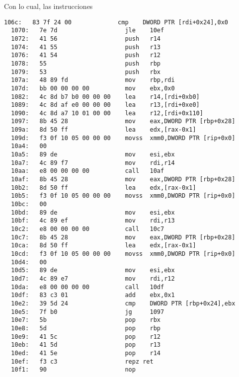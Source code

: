 Con lo cual, las instrucciones


\begin{lstlisting}[title=Función setCavityFlowSpeeds con optimización -O1]
  106c:   83 7f 24 00             cmp    DWORD PTR [rdi+0x24],0x0
  1070:   7e 7d                   jle    10ef
  1072:   41 56                   push   r14
  1074:   41 55                   push   r13
  1076:   41 54                   push   r12
  1078:   55                      push   rbp
  1079:   53                      push   rbx
  107a:   48 89 fd                mov    rbp,rdi
  107d:   bb 00 00 00 00          mov    ebx,0x0
  1082:   4c 8d b7 b0 00 00 00    lea    r14,[rdi+0xb0]
  1089:   4c 8d af e0 00 00 00    lea    r13,[rdi+0xe0]
  1090:   4c 8d a7 10 01 00 00    lea    r12,[rdi+0x110]
  1097:   8b 45 28                mov    eax,DWORD PTR [rbp+0x28]
  109a:   8d 50 ff                lea    edx,[rax-0x1]
  109d:   f3 0f 10 05 00 00 00    movss  xmm0,DWORD PTR [rip+0x0]
  10a4:   00 
  10a5:   89 de                   mov    esi,ebx
  10a7:   4c 89 f7                mov    rdi,r14
  10aa:   e8 00 00 00 00          call   10af
  10af:   8b 45 28                mov    eax,DWORD PTR [rbp+0x28]
  10b2:   8d 50 ff                lea    edx,[rax-0x1]
  10b5:   f3 0f 10 05 00 00 00    movss  xmm0,DWORD PTR [rip+0x0] 
  10bc:   00 
  10bd:   89 de                   mov    esi,ebx
  10bf:   4c 89 ef                mov    rdi,r13
  10c2:   e8 00 00 00 00          call   10c7
  10c7:   8b 45 28                mov    eax,DWORD PTR [rbp+0x28]
  10ca:   8d 50 ff                lea    edx,[rax-0x1]
  10cd:   f3 0f 10 05 00 00 00    movss  xmm0,DWORD PTR [rip+0x0]
  10d4:   00 
  10d5:   89 de                   mov    esi,ebx
  10d7:   4c 89 e7                mov    rdi,r12
  10da:   e8 00 00 00 00          call   10df
  10df:   83 c3 01                add    ebx,0x1
  10e2:   39 5d 24                cmp    DWORD PTR [rbp+0x24],ebx
  10e5:   7f b0                   jg     1097
  10e7:   5b                      pop    rbx
  10e8:   5d                      pop    rbp
  10e9:   41 5c                   pop    r12
  10eb:   41 5d                   pop    r13
  10ed:   41 5e                   pop    r14
  10ef:   f3 c3                   repz ret 
  10f1:   90                      nop
\end{lstlisting}

~\\

